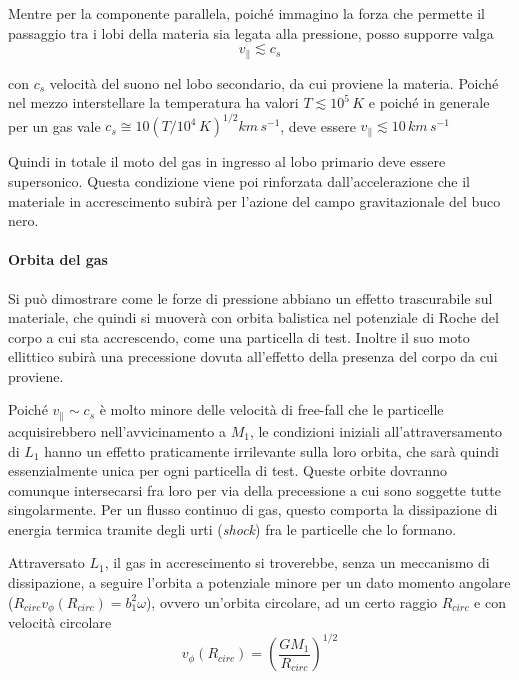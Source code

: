 \documentclass[a4paperbi]{article}
\begin{document}
	Mentre per la componente parallela, poiché immagino la forza che permette il passaggio tra i lobi della materia sia legata alla pressione, posso supporre valga
	\begin{equation}
		v_\parallel \lesssim c_{s}
	\end{equation}
	
	con $c_{s}$ velocità del suono nel lobo secondario, da cui proviene la materia. Poiché nel mezzo interstellare la temperatura ha valori $T\lesssim10^5\,K$ e poiché in generale per un gas vale $c_s\cong10(T/10^4\,K)^{1/2}km\,s^{-1}$, deve essere $v_\parallel\lesssim10\,km\,s^{-1}$
	
	Quindi in totale il moto del gas in ingresso al lobo primario deve essere supersonico. Questa condizione viene poi rinforzata dall'accelerazione che il materiale in accrescimento subirà per l'azione del campo gravitazionale del buco nero.

	\paragraph{Orbita del gas}	
	Si può dimostrare come le forze di pressione abbiano un effetto trascurabile sul materiale, che quindi si muoverà con orbita balistica nel potenziale di Roche del corpo a cui sta accrescendo, come una particella di test. Inoltre il suo moto ellittico subirà una precessione dovuta all'effetto della presenza del corpo da cui proviene.
	
	Poiché $v_\parallel\sim c_s$ è molto minore delle velocità di free-fall che le particelle acquisirebbero nell'avvicinamento a $M_1$, le condizioni iniziali all'attraversamento di $L_1$ hanno un effetto praticamente irrilevante sulla loro orbita, che sarà quindi essenzialmente unica per ogni particella di test. Queste orbite dovranno comunque intersecarsi fra loro per via della precessione a cui sono soggette tutte singolarmente. Per un flusso continuo di gas, questo comporta la dissipazione di energia termica tramite degli urti (\textit{shock}) fra le particelle che lo formano. 
	
	Attraversato $L_1$, il gas in accrescimento si troverebbe, senza un meccanismo di dissipazione, a seguire l'orbita a potenziale minore per un dato momento angolare ($R_{circ}v_\phi(R_{circ})=b_1^2\omega$), ovvero un'orbita circolare, ad un certo raggio $R_{circ}$ e con velocità circolare
	\begin{equation}
		v_\phi(R_{circ})=\left(\frac{GM_1}{R_{circ}}\right)^{1/2}
	\end{equation}
	
\end{document}

